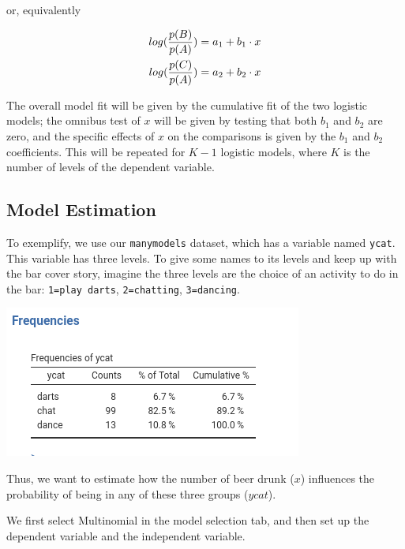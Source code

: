 \documentclass[
]{book}
\begin{document}
or, equivalently

\begin{align*}
 log({p(B) \over p(A)})  &= a_1 + b_1 \cdot x   \\
 log({p(C) \over p(A)})  &= a_2 + b_2 \cdot x   \\
\end{align*}

The overall model fit will be given by the cumulative fit of the two logistic models; the omnibus test of \(x\) will be given by testing that both \(b_1\) and \(b_2\) are zero, and the specific effects of \(x\) on the comparisons is given by the \(b_1\) and \(b_2\) coefficients. This will be repeated for \(K-1\) logistic models, where \(K\) is the number of levels of the dependent variable.

\hypertarget{model-estimation-1}{%
\subsection{Model Estimation}\label{model-estimation-1}}

To exemplify, we use our \texttt{manymodels} dataset, which has a variable named \texttt{ycat}. This variable has three levels. To give some names to its levels and keep up with the bar cover story, imagine the three levels are the choice of an activity to do in the bar: \texttt{1=play\ darts}, \texttt{2=chatting}, \texttt{3=dancing}.

\includegraphics{bookletpics/3_multi_output1.png}

Thus, we want to estimate how the number of beer drunk (\(x\)) influences the probability of being in any of these three groups (\(ycat\)).

We first select {Multinomial} in the model selection tab, and then set up the dependent variable and the independent variable.
\end{document}
